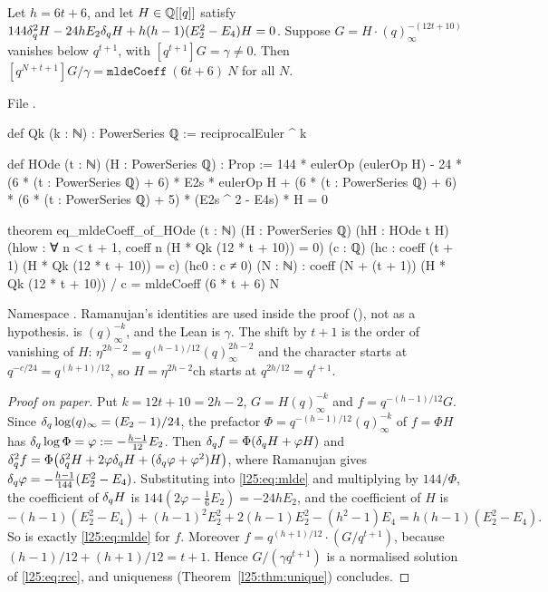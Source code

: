 \begin{theorem}\label{l25:thm:HOde}
Let $h=6t+6$, and let $H\in{\mathbb{Q}}[[q]]$ satisfy
$144\delta_q^2H-24hE_2\delta_q H+h(h-1)(E_2^2-E_4)H=0$. Suppose $G=H\cdot(q)_\infty^{-(12t+10)}$ vanishes
below $q^{t+1}$, with $[q^{t+1}]G=\gamma\ne0$. Then $[q^{N+t+1}]G/\gamma=\mathtt{mldeCoeff}\ (6t+6)\ N$ for all $N$.
\end{theorem}
\noindent File .
\begin{leancode}
def Qk (k : ℕ) : PowerSeries ℚ := reciprocalEuler ^ k

def HOde (t : ℕ) (H : PowerSeries ℚ) : Prop :=
  144 * eulerOp (eulerOp H) - 24 * (6 * (t : PowerSeries ℚ) + 6) * E2s * eulerOp H +
    (6 * (t : PowerSeries ℚ) + 6) * (6 * (t : PowerSeries ℚ) + 5) * (E2s ^ 2 - E4s) * H = 0

theorem eq_mldeCoeff_of_HOde (t : ℕ) (H : PowerSeries ℚ)
    (hH : HOde t H) (hlow : ∀ n < t + 1, coeff n (H * Qk (12 * t + 10)) = 0) (c : ℚ)
    (hc : coeff (t + 1) (H * Qk (12 * t + 10)) = c) (hc0 : c ≠ 0) (N : ℕ) :
    coeff (N + (t + 1)) (H * Qk (12 * t + 10)) / c = mldeCoeff (6 * t + 6) N
\end{leancode}
\begin{dictionary}
Namespace . Ramanujan's identities are used inside the proof
(), not as a hypothesis.  is $(q)_\infty^{-k}$, and the Lean  is
$\gamma$. The shift by $t+1$ is the order of vanishing of $H$: $\eta^{2h-2}=q^{(h-1)/12}(q)_\infty^{2h-2}$ and the
character starts at $q^{-c/24}=q^{(h+1)/12}$, so $H=\eta^{2h-2}\mathrm{ch}$ starts at $q^{2h/12}=q^{t+1}$.
\end{dictionary}
\begin{proof}[Proof on paper]
Put $k=12t+10=2h-2$, $G=H(q)_\infty^{-k}$ and $f=q^{-(h-1)/12}G$. Since $\delta_q\log(q)_\infty=(E_2-1)/24$,
the prefactor $\Phi=q^{-(h-1)/12}(q)_\infty^{-k}$ of $f=\Phi H$ has $\delta_q\log\Phi=\varphi:=-\frac{h-1}{12}E_2$.
Then $\delta_q f=\Phi(\delta_q H+\varphi H)$ and
$\delta_q^2f=\Phi\big(\delta_q^2H+2\varphi\delta_q H+(\delta_q\varphi+\varphi^2)H\big)$, where Ramanujan
gives $\delta_q\varphi=-\frac{h-1}{144}(E_2^2-E_4)$. Substituting into \eqref{l25:eq:mlde} and multiplying by
$144/\Phi$, the coefficient of $\delta_q H$ is $144(2\varphi-\frac16E_2)=-24hE_2$, and the coefficient of $H$ is
\begin{equation*}
-(h-1)(E_2^2-E_4)+(h-1)^2E_2^2+2(h-1)E_2^2-(h^2-1)E_4=h(h-1)(E_2^2-E_4).
\end{equation*}
So  is exactly \eqref{l25:eq:mlde} for $f$. Moreover $f=q^{(h+1)/12}\cdot(G/q^{t+1})$, because
$(h-1)/12+(h+1)/12=t+1$. Hence $G/(\gamma q^{t+1})$ is a normalised solution of \eqref{l25:eq:rec}, and uniqueness
(Theorem~\ref{l25:thm:unique}) concludes.
\end{proof}
